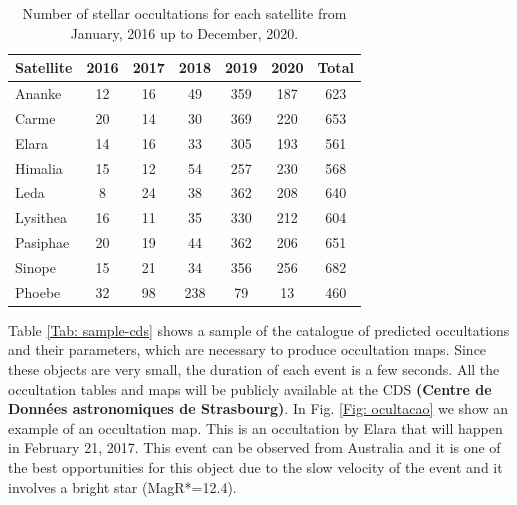 \documentclass[useAMS,usenatbib]{mn2e}
\begin{document}
\begin{table}
\caption{\label{Tab: satellite-occultation} Number of stellar occultations for each satellite from January, 2016 up to December, 2020.}
\begin{centering}
\begin{tabular}{lcccccc}
\hline  \hline
Satellite  & 2016 & 2017 & 2018 & 2019 & 2020 & Total \tabularnewline
\hline
Ananke & 12 & 16 & 49 & 359 & 187 & 623 \tabularnewline
Carme & 20 & 14 & 30 & 369 & 220 & 653 \tabularnewline
Elara & 14 & 16 & 33 & 305 & 193 & 561 \tabularnewline
Himalia & 15 & 12 & 54 & 257 & 230 & 568 \tabularnewline
Leda & 8 & 24 & 38 & 362 & 208 & 640 \tabularnewline
Lysithea & 16 & 11 & 35 & 330 & 212 & 604 \tabularnewline
Pasiphae & 20 & 19 & 44 & 362 & 206 & 651 \tabularnewline
Sinope & 15 & 21 & 34 & 356 & 256 & 682 \tabularnewline
\hdashline
Phoebe & 32 & 98 & 238 & 79 & 13 & 460 \tabularnewline
\hline
\end{tabular}
\par \end{centering}
\end{table}

Table \ref{Tab: sample-cds} shows a sample of the catalogue of predicted occultations and their parameters, which are necessary to produce occultation maps. Since these objects are very small, the duration of each event is a few seconds. All the occultation tables and maps will be publicly available at the CDS \textbf{(Centre de Données astronomiques de Strasbourg)}. In Fig. \ref{Fig: ocultacao} we show an example of an occultation map. This is an occultation by Elara that will happen in February 21, 2017. This event can be observed from Australia and it is one of the best opportunities for this object due to the slow velocity of the event and it involves a bright star (MagR*=12.4).
\end{document}
